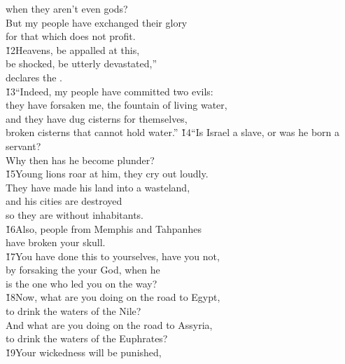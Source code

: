 \begin{poetry}
\poemll    when they aren't even gods? \\
\poeml But my people have exchanged their glory \\
\poemll    for that which does not profit. \\
\poeml \v{12}Heavens, be appalled at this, \\
\poemll    be shocked, be utterly devastated,'' \\
\poemlll       declares the . \\
\poeml \v{13}``Indeed, my people have committed two evils: \\
\poemll    they have forsaken me, the fountain of living water, \\
\poeml and they have dug cisterns for themselves, \\
\poemll    broken cisterns that cannot hold water.''
\poeml \v{14}``Is Israel a slave, or was he born a servant? \\
\poemll    Why then has he become plunder? \\
\poeml \v{15}Young lions roar at him, they cry out loudly. \\
\poemll    They have made his land into a wasteland, \\
\poeml and his cities are destroyed \\
\poemll    so they are without inhabitants. \\
\poeml \v{16}Also, people from Memphis and Tahpanhes \\
\poemll    have broken your skull. \\
\poeml \v{17}You have done this to yourselves, have you not, \\
\poemll    by forsaking the  your God, when he \\
\poemlll       is the one who led you on the way? \\
\poeml \v{18}Now, what are you doing on the road to Egypt, \\
\poemll    to drink the waters of the Nile? \\
\poeml And what are you doing on the road to Assyria, \\
\poemll    to drink the waters of the Euphrates? \\
\poeml \v{19}Your wickedness will be punished, \\

\end{poetry}

